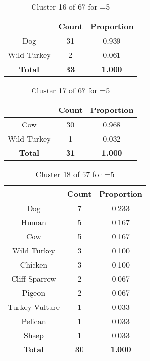 \begin{table}[ht!]
\centering
\begin{tabular}{|c|c|c|}
\hline
\bf \Spec{} &\bf Count &\bf Proportion\\ \hline \hline
Dog & 31 & 0.939\\ \hline
Wild Turkey & 2 & 0.061\\ \hline
\hline
\bf Total & \bf 33 & \bf 1.000\\ \hline
\end{tabular}
\label{tab:cluster:16:5}
\caption{Cluster 16 of 67 for \minneigh{}=5}
\end{table}

\begin{table}[ht!]
\centering
\begin{tabular}{|c|c|c|}
\hline
\bf \Spec{} &\bf Count &\bf Proportion\\ \hline \hline
Cow & 30 & 0.968\\ \hline
Wild Turkey & 1 & 0.032\\ \hline
\hline
\bf Total & \bf 31 & \bf 1.000\\ \hline
\end{tabular}
\label{tab:cluster:17:5}
\caption{Cluster 17 of 67 for \minneigh{}=5}
\end{table}

\begin{table}[ht!]
\centering
\begin{tabular}{|c|c|c|}
\hline
\bf \Spec{} &\bf Count &\bf Proportion\\ \hline \hline
Dog & 7 & 0.233\\ \hline
Human & 5 & 0.167\\ \hline
Cow & 5 & 0.167\\ \hline
Wild Turkey & 3 & 0.100\\ \hline
Chicken & 3 & 0.100\\ \hline
Cliff Sparrow & 2 & 0.067\\ \hline
Pigeon & 2 & 0.067\\ \hline
Turkey Vulture & 1 & 0.033\\ \hline
Pelican & 1 & 0.033\\ \hline
Sheep & 1 & 0.033\\ \hline
\hline
\bf Total & \bf 30 & \bf 1.000\\ \hline
\end{tabular}
\label{tab:cluster:18:5}
\caption{Cluster 18 of 67 for \minneigh{}=5}
\end{table}

